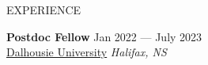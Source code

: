 \documentclass{resume} %
\begin{document}
\begin{rSection}{EXPERIENCE}


\textbf{Postdoc Fellow  } \hfill Jan 2022 --- July 2023\\
\underline{Dalhousie University} \hfill \textit{Halifax, NS}\\


\end{rSection}
\end{document}
